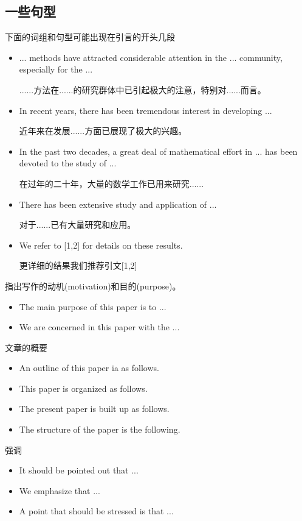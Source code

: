 \documentclass[11pt,final]{article}
\numberwithin{equation}{section}
\begin{document}
\subsection{一些句型}
下面的词组和句型可能出现在引言的开头几段
\begin{itemize}
	\item ... methods have attracted considerable attention in the ... community, especially for the ...
	
	......方法在......的研究群体中已引起极大的注意，特别对......而言。
	\item In recent years, there has been tremendous interest in developing ...
	
	近年来在发展......方面已展现了极大的兴趣。
	\item In the past two decades, a great deal of mathematical effort in ... has been devoted to the study of ...
	
	在过年的二十年，大量的数学工作已用来研究......
	\item There has been extensive study and application of ...
	
	对于......已有大量研究和应用。
	
	\item We refer to [1,2] for details on these results.
	
	更详细的结果我们推荐引文[1,2]
\end{itemize}

\noindent 指出写作的动机(motivation)和目的(purpose)。
\begin{itemize}
	\item The main purpose of this paper is to ...
	\item We are concerned in this paper with the ...
\end{itemize}

\noindent 文章的概要
\begin{itemize}
	\item An outline of this paper ia as follows.
	\item This paper is organized as follows.
	\item The present paper is built up as follows.
	\item The structure of the paper is the following. 
\end{itemize}

\noindent 强调
\begin{itemize}
	\item It should be pointed out that ...
	\item We emphasize that ...
	\item A point that should be stressed is that ...
\end{itemize}	
\end{document}
